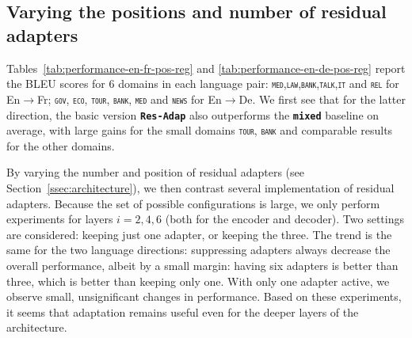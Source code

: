 \documentclass[11pt,a4paper]{article}
\newcommand{\fyTodo}[1]{\Todo[FY:]{\textcolor{orange}{#1}}}
\newcommand{\fyDone}[1]{\done[FY]\Todo[FY:]{\textcolor{orange}{#1}}}
\newcommand{\fyFuture}[1]{\done[FY]\Todo[FY:]{\textcolor{red}{#1}}}
\newcommand{\domain}[1]{\texttt{\textsc{#1}}}
\newcommand{\system}[1]{\texttt{\textbf{#1}}}
\begin{document}

\subsection{Varying the positions and number of residual adapters}

Tables~\ref{tab:performance-en-fr-pos-reg} and \ref{tab:performance-en-de-pos-reg} report the BLEU scores for 6 domains in each language pair: \domain{med},\domain{law},\domain{bank},\domain{talk},\domain{it} and \domain{rel} for En$\rightarrow$Fr; \domain{gov}, \domain{eco}, \domain{tour}, \domain{bank}, \domain{med} and \domain{news} for En$\rightarrow$De. We first see that for the latter direction, the basic version \system{Res-Adap} also outperforms the \system{mixed} baseline on average, with large gains for the small domains \domain{tour}, \domain{bank} and comparable results for the other domains.
\fyFuture{Full FT for en->DE ? }

By varying the number and position of residual adapters (see Section~\ref{ssec:architecture}), we then contrast several implementation of residual adapters. \fyDone{Fix style here} Because the set of possible configurations is large, we only perform experiments for layers $i= 2, 4, 6$ (both for the encoder and decoder). Two settings are considered: keeping just one adapter, or keeping the three. The trend is the same for the two language directions: suppressing adapters always decrease the overall performance, albeit by a small margin: having six adapters is better than three, which is better than keeping only one. With only one adapter active, we observe small, unsignificant changes in performance. Based on these experiments, it seems that adaptation remains useful even for the deeper layers of the architecture.

\end{document}
